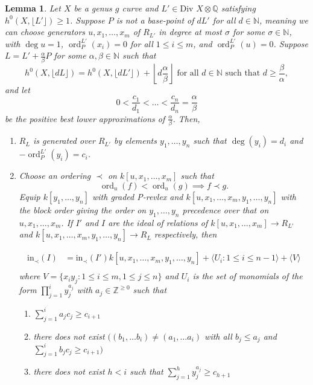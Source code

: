 \documentclass{amsart}
\theoremstyle{plain}
\newtheorem{lem}[thm]{Lemma}
\theoremstyle{definition}
\theoremstyle{remark}
\numberwithin{equation}{section}
\newcommand\BQ{{\mathbb Q}}
\newcommand \di{\text{Div }}
\DeclareMathOperator{\ord}{ord}
\newcommand \halfcan{L}
\newcommand \initial{\text{in}}
\begin{document}
\begin{lem}
\label{lem:sat-1}
Let $X$ be a genus $g$ curve and $\halfcan' \in \di X \otimes \BQ$
satisfying $h^0(X, \lfloor{\halfcan'}\rfloor)\ge 1$. Suppose $P$ is not a base-point of $d\halfcan'$ for all $d\in \mathbb{N}$, meaning we can choose generators $u, x_1, \ldots, x_m$ of $R_{\halfcan'}$ in degree at most $\sigma$ for some $\sigma\in \mathbb{N}$, with $\deg u = 1$, $\ord_P^{\halfcan'}(x_i)=0$ for all $1 \leq i \leq m$, and $\ord_P^{\halfcan'}(u) = 0$.  Suppose $\halfcan = \halfcan' + \frac{\alpha}{\beta} P$
for some $\alpha,\beta \in \mathbb{N}$ such that
\begin{equation}
\label{eqn:deg1-sat-ind}
	h^0(X, \lfloor{d\halfcan}\rfloor) = h^0(X,\lfloor d\halfcan'
	\rfloor) + \left\lfloor d\frac{\alpha} {\beta} \right \rfloor \text{ for all } d \in \mathbb{
	N} \text{ such that } d \ge \frac{\beta}{\alpha},
\end{equation}
and let
\[
	0 < \frac{c_1}{d_1} < \ldots < \frac{c_n}{d_n} = \frac{\alpha}{\beta}
\]
be the positive best lower approximations of $\frac{\alpha}{\beta}$.
Then,

\begin{enumerate}
\item[(a)] $R_{\halfcan}$ is generated over $R_{\halfcan'}$ by elements $y_1, \ldots, y_n$ such that $\deg(y_i)=d_i$ and $-\ord_P^{L'}(y_i)=c_i$.

\item[(b)] Choose an ordering $\prec$ on $k[u, x_1, \ldots, x_m]$ such that
\[
	\ord_u(f) < \ord_u(g) \implies f\prec g.
\]
Equip $k[y_1, \ldots, y_n]$ with graded P-revlex and $k[u, x_1, \ldots, x_m, y_1, \ldots, y_n]$ with the block order giving the order on $y_1, \ldots, y_n$ precedence over that on $u, x_1, \ldots, x_m$.  
If $I'$ and $I$ are the ideal of relations of $k[u, x_1, \ldots, x_m]\to R_{\halfcan'}$ and $k[u, x_1, \ldots, x_m, y_1, \ldots, y_n]\to R_{\halfcan}$ respectively, then 

\begin{align*}
	\initial_\prec(I) &= \initial_\prec(I') k[u, x_1, \ldots, x_m, y_1, \ldots, y_n] 
										 + \langle U_i: 1 \le i \le n-1 \rangle
										 + \langle V \rangle\\
\end{align*}
where 
$V=\{x_i y_j: 1\le i\le m, 1\le j\le n\}$
 and $U_i$ is the set of monomials of the form $\prod_{j=1}^{i} y_j^{a_j}$ with $a_j\in \mathbb{Z}^{\ge 0}$ such that
\begin{enumerate}
	\item[(1)] $\sum_{j=1}^i a_j c_j \ge c_{i+1}$\\
	\item[(2)] there does not exist $((b_1, \ldots b_i)\ne (a_1, \ldots a_i)$ with all $b_j\le a_j$ and $\sum_{j=1}^i b_jc_j\ge c_{i+1})$ \\
	\item[(3)] there does not exist $h<i$ such that $\sum_{j=1}^h y_j^{a_j}\ge c_{h+1}$
\end{enumerate}


\end{enumerate}
\end{lem}
\end{document}
